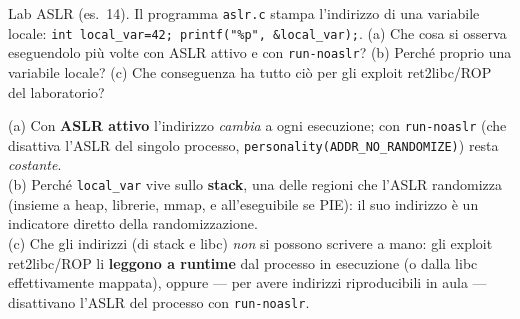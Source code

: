 \question[5]
Lab ASLR (es.\ 14). Il programma \lstinline|aslr.c| stampa l'indirizzo di una variabile locale: \lstinline|int local_var=42; printf("%p", &local_var);|.
(a) Che cosa si osserva eseguendolo più volte con ASLR attivo e con \lstinline|run-noaslr|? (b) Perché proprio una variabile locale? (c) Che conseguenza ha tutto ciò per gli exploit ret2libc/ROP del laboratorio?
\begin{solution}
(a) Con \textbf{ASLR attivo} l'indirizzo \emph{cambia} a ogni esecuzione; con \lstinline|run-noaslr| (che disattiva l'ASLR del singolo processo, \lstinline|personality(ADDR_NO_RANDOMIZE)|) resta \emph{costante}.\\
(b) Perché \lstinline|local_var| vive sullo \textbf{stack}, una delle regioni che l'ASLR randomizza (insieme a heap, librerie, mmap, e all'eseguibile se PIE): il suo indirizzo è un indicatore diretto della randomizzazione.\\
(c) Che gli indirizzi (di stack e libc) \emph{non} si possono scrivere a mano: gli exploit ret2libc/ROP li \textbf{leggono a runtime} dal processo in esecuzione (o dalla libc effettivamente mappata), oppure --- per avere indirizzi riproducibili in aula --- disattivano l'ASLR del processo con \lstinline|run-noaslr|.
\end{solution}
